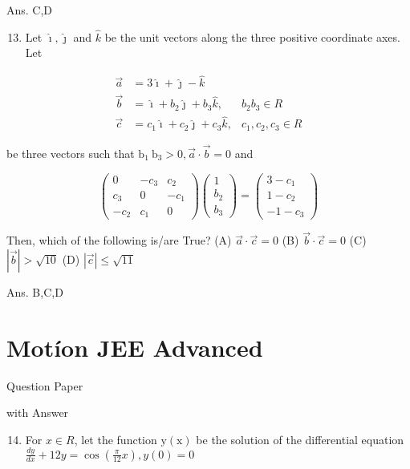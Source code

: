 \documentclass[10pt]{article}
\begin{document}
Ans. C,D

\begin{enumerate}
  \setcounter{enumi}{12}
  \item Let $\hat{\imath}, \hat{\jmath}$ and $\hat{k}$ be the unit vectors along the three positive coordinate axes. Let
\end{enumerate}

$$
\begin{array}{rlr}
\vec{a} & =3 \hat{\imath}+\hat{\jmath}-\hat{k} & \\
\vec{b} & =\hat{\imath}+b_{2} \hat{\jmath}+b_{3} \hat{k}, & b_{2} b_{3} \in R \\
\vec{c} & =c_{1} \hat{\imath}+c_{2} \hat{\jmath}+c_{3} \hat{k}, & c_{1}, c_{2}, c_{3} \in R
\end{array}
$$

be three vectors such that $\mathrm{b}_{1} \mathrm{~b}_{3}>0, \vec{a} \cdot \vec{b}=0$ and

$$
\left(\begin{array}{ccc}
0 & -c_{3} & c_{2} \\
c_{3} & 0 & -c_{1} \\
-c_{2} & c_{1} & 0
\end{array}\right)\left(\begin{array}{c}
1 \\
b_{2} \\
b_{3}
\end{array}\right)=\left(\begin{array}{c}
3-c_{1} \\
1-c_{2} \\
-1-c_{3}
\end{array}\right)
$$

Then, which of the following is/are True?
(A) $\vec{a} \cdot \vec{c}=0$
(B) $\vec{b} \cdot \vec{c}=0$
(C) $|\vec{b}|>\sqrt{10}$
(D) $|\vec{c}| \leq \sqrt{11}$

Ans. B,C,D

\section{Motíon JEE Advanced}
Question Paper

with Answer

\begin{enumerate}
  \setcounter{enumi}{13}
  \item For $x \in R$, let the function $\mathrm{y}(\mathrm{x})$ be the solution of the differential equation $\frac{d y}{d x}+12 y=\cos \left(\frac{\pi}{12} x\right), y(0)=0$
\end{enumerate}
\end{document}
